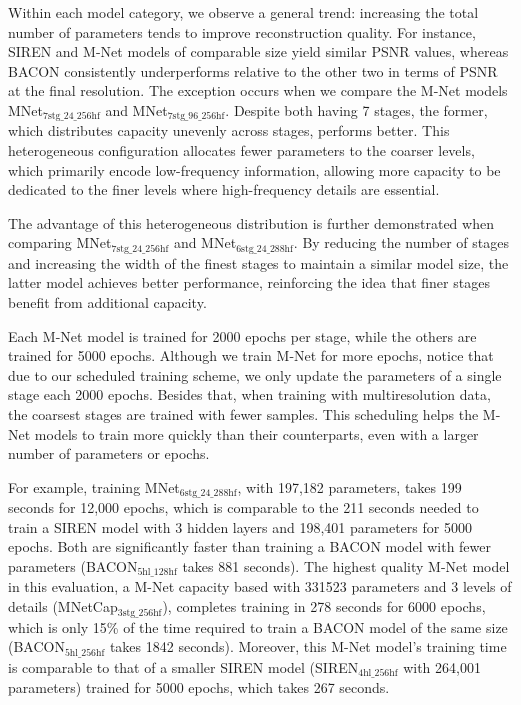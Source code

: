 Within each model category, we observe a general trend: increasing the total number of parameters tends to improve reconstruction quality. For instance, SIREN and M-Net models of comparable size yield similar PSNR values, whereas BACON consistently underperforms relative to the other two in terms of PSNR at the final resolution. The exception occurs when we compare the M-Net models MNet$_\text{7stg\_24\_256hf}$ and MNet$_\text{7stg\_96\_256hf}$. Despite both having 7 stages, the former, which distributes capacity unevenly across stages, performs better. This heterogeneous configuration allocates fewer parameters to the coarser levels, which primarily encode low-frequency information, allowing more capacity to be dedicated to the finer levels where high-frequency details are essential. 

The advantage of this heterogeneous distribution is further demonstrated when comparing MNet$_\text{7stg\_24\_256hf}$ and MNet$_\text{6stg\_24\_288hf}$. By reducing the number of stages and increasing the width of the finest stages to maintain a similar model size, the latter model achieves better performance, reinforcing the idea that finer stages benefit from additional capacity.


Each M-Net model is trained for 2000 epochs per stage, while the others are trained for 5000 epochs. Although we train M-Net for more epochs, notice that due to our scheduled training scheme, we only update the parameters of a single stage each 2000 epochs. Besides that, when training with multiresolution data, the coarsest stages are trained with fewer samples. This scheduling helps the M-Net models to train more quickly than their counterparts, even with a larger number of parameters or epochs. 

For example, training MNet$_\text{6stg\_24\_288hf}$, with 197,182 parameters, takes 199 seconds for 12,000 epochs, which is comparable to the 211 seconds needed to train a SIREN model with 3 hidden layers and 198,401 parameters for 5000 epochs. Both are significantly faster than training a BACON model with fewer parameters (BACON$_\text{5hl\_128hf}$ takes 881 seconds). The highest quality M-Net model in this evaluation, a M-Net capacity based with 331523 parameters and 3 levels of details (MNetCap$_\text{3stg\_256hf}$), completes training in 278 seconds for 6000 epochs, which is only 15\% of the time required to train a BACON model of the same size (BACON$_\text{5hl\_256hf}$ takes 1842 seconds). Moreover, this M-Net model's training time is comparable to that of a smaller SIREN model (SIREN$_\text{4hl\_256hf}$ with 264,001 parameters) trained for 5000 epochs, which takes 267 seconds.

